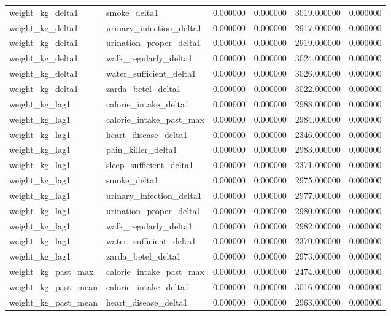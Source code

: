 \begin{longtable}{llrrrr}
weight\_kg\_delta1 & smoke\_delta1 & 0.000000 & 0.000000 & 3019.000000 & 0.000000 \\
weight\_kg\_delta1 & urinary\_infection\_delta1 & 0.000000 & 0.000000 & 2917.000000 & 0.000000 \\
weight\_kg\_delta1 & urination\_proper\_delta1 & 0.000000 & 0.000000 & 2919.000000 & 0.000000 \\
weight\_kg\_delta1 & walk\_regularly\_delta1 & 0.000000 & 0.000000 & 3024.000000 & 0.000000 \\
weight\_kg\_delta1 & water\_sufficient\_delta1 & 0.000000 & 0.000000 & 3026.000000 & 0.000000 \\
weight\_kg\_delta1 & zarda\_betel\_delta1 & 0.000000 & 0.000000 & 3022.000000 & 0.000000 \\
weight\_kg\_lag1 & calorie\_intake\_delta1 & 0.000000 & 0.000000 & 2988.000000 & 0.000000 \\
weight\_kg\_lag1 & calorie\_intake\_past\_max & 0.000000 & 0.000000 & 2984.000000 & 0.000000 \\
weight\_kg\_lag1 & heart\_disease\_delta1 & 0.000000 & 0.000000 & 2346.000000 & 0.000000 \\
weight\_kg\_lag1 & pain\_killer\_delta1 & 0.000000 & 0.000000 & 2983.000000 & 0.000000 \\
weight\_kg\_lag1 & sleep\_sufficient\_delta1 & 0.000000 & 0.000000 & 2371.000000 & 0.000000 \\
weight\_kg\_lag1 & smoke\_delta1 & 0.000000 & 0.000000 & 2975.000000 & 0.000000 \\
weight\_kg\_lag1 & urinary\_infection\_delta1 & 0.000000 & 0.000000 & 2977.000000 & 0.000000 \\
weight\_kg\_lag1 & urination\_proper\_delta1 & 0.000000 & 0.000000 & 2980.000000 & 0.000000 \\
weight\_kg\_lag1 & walk\_regularly\_delta1 & 0.000000 & 0.000000 & 2982.000000 & 0.000000 \\
weight\_kg\_lag1 & water\_sufficient\_delta1 & 0.000000 & 0.000000 & 2370.000000 & 0.000000 \\
weight\_kg\_lag1 & zarda\_betel\_delta1 & 0.000000 & 0.000000 & 2973.000000 & 0.000000 \\
weight\_kg\_past\_max & calorie\_intake\_past\_max & 0.000000 & 0.000000 & 2474.000000 & 0.000000 \\
weight\_kg\_past\_mean & calorie\_intake\_delta1 & 0.000000 & 0.000000 & 3016.000000 & 0.000000 \\
weight\_kg\_past\_mean & heart\_disease\_delta1 & 0.000000 & 0.000000 & 2963.000000 & 0.000000 \\

\end{longtable}
